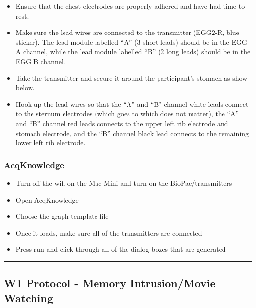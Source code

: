 \documentclass[
]{book}
\providecommand{\tightlist}{%
  \setlength{\itemsep}{0pt}\setlength{\parskip}{0pt}}
\begin{document}
\begin{itemize}
\tightlist
\item
  Ensure that the chest electrodes are properly adhered and have had time to rest.
\item
  Make sure the lead wires are connected to the transmitter (EGG2-R, blue sticker). The lead module labelled ``A'' (3 short leads) should be in the EGG A channel, while the lead module labelled ``B'' (2 long leads) should be in the EGG B channel.
\item
  Take the transmitter and secure it around the participant's stomach as show below.
\item
  Hook up the lead wires so that the ``A'' and ``B'' channel white leads connect to the sternum electrodes (which goes to which does not matter), the ``A'' and ``B'' channel red leads connects to the upper left rib electrode and stomach electrode, and the ``B'' channel black lead connects to the remaining lower left rib electrode.
\end{itemize}

\hypertarget{acqknowledge}{%
\subsubsection{AcqKnowledge}\label{acqknowledge}}

\begin{itemize}
\tightlist
\item
  Turn off the wifi on the Mac Mini and turn on the BioPac/transmitters
\item
  Open AcqKnowledge
\item
  Choose the graph template file
\item
  Once it loads, make sure all of the transmitters are connected
\item
  Press run and click through all of the dialog boxes that are generated
\end{itemize}

\begin{center}\rule{0.5\linewidth}{0.5pt}\end{center}

\hypertarget{w1-protocol---memory-intrusionmovie-watching}{%
\subsection{W1 Protocol - Memory Intrusion/Movie Watching}\label{w1-protocol---memory-intrusionmovie-watching}}
\end{document}
